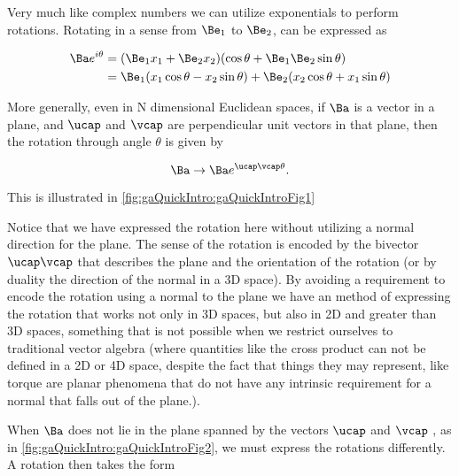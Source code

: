 %
%

Very much like complex numbers we can utilize exponentials to perform rotations.  Rotating in a sense from \(\Be_1\) to \(\Be_2\), can be expressed as

\begin{equation}\label{eqn:gaQuickIntro:290}
\begin{aligned}
\Ba e^{i \theta}
&=
(\Be_1 x_1 + \Be_2 x_2) (\cos\theta + \Be_1 \Be_2 \sin\theta) \\
&=
\Be_1 (x_1 \cos\theta - x_2 \sin\theta)
+
\Be_2 (x_2 \cos\theta + x_1 \sin\theta)
\end{aligned}
\end{equation}

More generally, even in N dimensional Euclidean spaces, if \(\Ba\) is a vector in a plane, and \(\ucap\) and \(\vcap\) are perpendicular unit vectors in that plane, then the rotation through angle \(\theta\) is given by

\begin{equation}\label{eqn:gaQuickIntro:190}
\Ba \rightarrow \Ba e^{\ucap \vcap \theta}.
\end{equation}

This is illustrated in \cref{fig:gaQuickIntro:gaQuickIntroFig1}


Notice that we have expressed the rotation here without utilizing a normal direction for the plane.  The sense of the rotation is encoded by the bivector \(\ucap \vcap\) that describes the plane and the orientation of the rotation (or by duality the direction of the normal in a 3D space).  By avoiding a requirement to encode the rotation using a normal to the plane we have an method of expressing the rotation that works not only in 3D spaces, but also in 2D and greater than 3D spaces, something that is not possible when we restrict ourselves to traditional vector algebra (where quantities like the cross product can not be defined in a 2D or 4D space, despite the fact that things they may represent, like torque are planar phenomena that do not have any intrinsic requirement for a normal that falls out of the plane.).

When \(\Ba\) does not lie in the plane spanned by the vectors \(\ucap\) and \(\vcap\) , as in \cref{fig:gaQuickIntro:gaQuickIntroFig2}, we must express the rotations differently.  A rotation then takes the form

